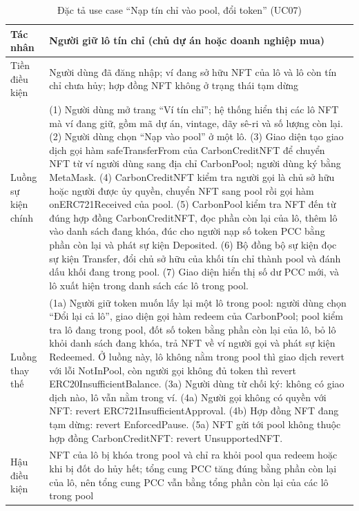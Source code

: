 \begin{table}[!htbp]
    \centering
    \caption{Đặc tả use case ``Nạp tín chỉ vào pool, đổi token'' (UC07)}
    \label{tab:dt-uc07}
    \small
    \begin{tabularx}{\textwidth}{|L{2.8cm}|Y|}
        \hline
        Tác nhân & Người giữ lô tín chỉ (chủ dự án hoặc doanh nghiệp mua) \\
        \hline
        Tiền điều kiện & Người dùng đã đăng nhập; ví đang sở hữu NFT của lô và lô còn tín chỉ chưa hủy; hợp đồng NFT không ở trạng thái tạm dừng \\
        \hline
        Luồng sự kiện chính & (1) Người dùng mở trang ``Ví tín chỉ''; hệ thống hiển thị các lô NFT mà ví đang giữ, gồm mã dự án, vintage, dãy sê-ri và số lượng còn lại.\newline
        (2) Người dùng chọn ``Nạp vào pool'' ở một lô.\newline
        (3) Giao diện tạo giao dịch gọi hàm safeTransferFrom của CarbonCreditNFT để chuyển NFT từ ví người dùng sang địa chỉ CarbonPool; người dùng ký bằng MetaMask.\newline
        (4) CarbonCreditNFT kiểm tra người gọi là chủ sở hữu hoặc người được ủy quyền, chuyển NFT sang pool rồi gọi hàm onERC721Received của pool.\newline
        (5) CarbonPool kiểm tra NFT đến từ đúng hợp đồng CarbonCreditNFT, đọc phần còn lại của lô, thêm lô vào danh sách đang khóa, đúc cho người nạp số token PCC bằng phần còn lại và phát sự kiện Deposited.\newline
        (6) Bộ đồng bộ sự kiện đọc sự kiện Transfer, đổi chủ sở hữu của khối tín chỉ thành pool và đánh dấu khối đang trong pool.\newline
        (7) Giao diện hiển thị số dư PCC mới, và lô xuất hiện trong danh sách các lô trong pool. \\
        \hline
        Luồng thay thế & (1a) Người giữ token muốn lấy lại một lô trong pool: người dùng chọn ``Đổi lại cả lô'', giao diện gọi hàm redeem của CarbonPool; pool kiểm tra lô đang trong pool, đốt số token bằng phần còn lại của lô, bỏ lô khỏi danh sách đang khóa, trả NFT về ví người gọi và phát sự kiện Redeemed. Ở luồng này, lô không nằm trong pool thì giao dịch revert với lỗi NotInPool, còn người gọi không đủ token thì revert ERC20InsufficientBalance.\newline
        (3a) Người dùng từ chối ký: không có giao dịch nào, lô vẫn nằm trong ví.\newline
        (4a) Người gọi không có quyền với NFT: revert ERC721InsufficientApproval.\newline
        (4b) Hợp đồng NFT đang tạm dừng: revert EnforcedPause.\newline
        (5a) NFT gửi tới pool không thuộc hợp đồng CarbonCreditNFT: revert UnsupportedNFT. \\
        \hline
        Hậu điều kiện & NFT của lô bị khóa trong pool và chỉ ra khỏi pool qua redeem hoặc khi bị đốt do hủy hết; tổng cung PCC tăng đúng bằng phần còn lại của lô, nên tổng cung PCC vẫn bằng tổng phần còn lại của các lô trong pool \\
        \hline
    \end{tabularx}
\end{table}

